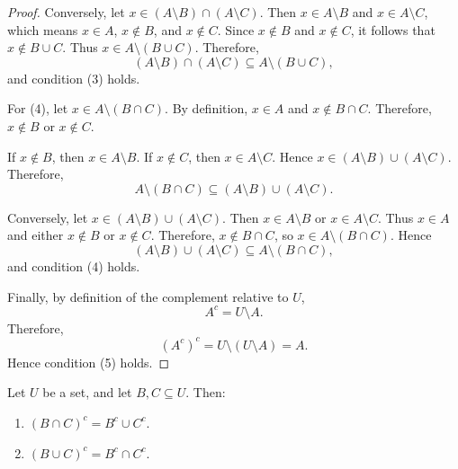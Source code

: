 \begin{proof}
   Conversely, let $x \in (A \setminus B) \cap (A \setminus C)$. Then $x \in A \setminus B$ and $x \in A \setminus C$, which means $x \in A$, $x \notin B$, and $x \notin C$. Since $x \notin B$ and $x \notin C$, it follows that $x \notin B \cup C$. Thus $x \in A \setminus (B \cup C)$. Therefore, \[(A \setminus B) \cap (A \setminus C) \subseteq A \setminus (B \cup C),\] and condition (3) holds.

   For (4), let $x \in A \setminus (B \cap C)$. By definition, $x \in A$ and $x \notin B \cap C$. Therefore, $x \notin B$ or $x \notin C$.

   If $x \notin B$, then $x \in A \setminus B$. If $x \notin C$, then $x \in A \setminus C$. Hence $x \in (A \setminus B) \cup (A \setminus C)$. Therefore, \[A \setminus (B \cap C) \subseteq (A \setminus B) \cup (A \setminus C).\]

   Conversely, let $x \in (A \setminus B) \cup (A \setminus C)$. Then $x \in A \setminus B$ or $x \in A \setminus C$. Thus $x \in A$ and either $x \notin B$ or $x \notin C$. Therefore, $x \notin B \cap C$, so $x \in A \setminus (B \cap C)$. Hence \[(A \setminus B) \cup (A \setminus C) \subseteq A \setminus (B \cap C),\] and condition (4) holds.

   Finally, by definition of the complement relative to $U$, \[A^c = U \setminus A.\] Therefore, \[(A^c)^c = U \setminus (U \setminus A) = A.\] Hence condition (5) holds.
\end{proof}

\begin{propbox}
   Let $U$ be a set, and let $B,C \subseteq U$. Then:
   \begin{enumerate}
      \item $(B \cap C)^c = B^c \cup C^c$.
      \item $(B \cup C)^c = B^c \cap C^c$.
   \end{enumerate}
\end{propbox}

